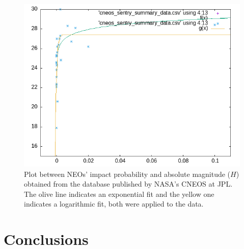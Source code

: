\documentclass[
	a4paper, %
	10pt, %
	unnumberedsections, %
	twoside, %
]{LTJournalArticle}
\begin{document}
\begin{figure}[H] %
	\includegraphics[width=\linewidth]{correlation.png}
	\caption{Plot between NEOs' impact probability and absolute magnitude ($H$) obtained from the database published by NASA’s CNEOS at JPL. The olive line indicates an exponential fit and the yellow one indicates a logarithmic fit, both were applied to the data.}
	\label{fig:probability}
\end{figure}


\section{Conclusions}



\printbibliography %

\end{document}
